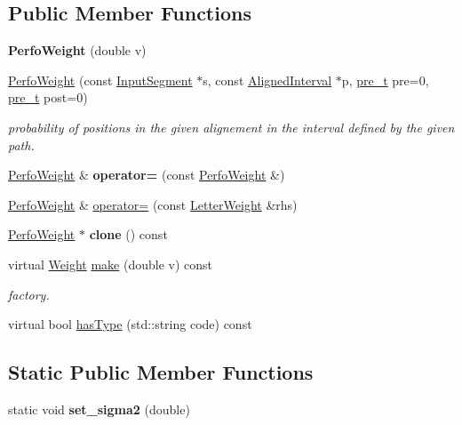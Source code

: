 \subsection*{Public Member Functions}
\begin{DoxyCompactItemize}
\item 
\mbox{\label{classPerfoWeight_a37edc602ff52c15e3a3306935c4f7f2a}} 
{\bfseries Perfo\+Weight} (double v)
\item 
\mbox{\hyperlink{group__weight_gaa4edfc478ea676a169bd5b58b82ff352}{Perfo\+Weight}} (const \mbox{\hyperlink{classInputSegment}{Input\+Segment}} $\ast$s, const \mbox{\hyperlink{classAlignedInterval}{Aligned\+Interval}} $\ast$p, \mbox{\hyperlink{group__general_ga092fe8b972dfa977c2a0886720a7731e}{pre\+\_\+t}} pre=0, \mbox{\hyperlink{group__general_ga092fe8b972dfa977c2a0886720a7731e}{pre\+\_\+t}} post=0)
\begin{DoxyCompactList}\small\item\em probability of positions in the given alignement in the interval defined by the given path. \end{DoxyCompactList}\item 
\mbox{\hyperlink{classPerfoWeight}{Perfo\+Weight}} \& {\bfseries operator=} (const \mbox{\hyperlink{classPerfoWeight}{Perfo\+Weight}} \&)
\item 
\mbox{\hyperlink{classPerfoWeight}{Perfo\+Weight}} \& \mbox{\hyperlink{group__weight_gaabb75d1419be3bb59dcdd3b8e56b0e63}{operator=}} (const \mbox{\hyperlink{classLetterWeight}{Letter\+Weight}} \&rhs)
\item 
\mbox{\label{classPerfoWeight_a8023bda84f8e883bbad23b31c1ccdd0b}} 
\mbox{\hyperlink{classPerfoWeight}{Perfo\+Weight}} $\ast$ {\bfseries clone} () const
\item 
virtual \mbox{\hyperlink{classWeight}{Weight}} \mbox{\hyperlink{classPerfoWeight_ad9237d9b3fccf6f0b70133e10c1103b2}{make}} (double v) const
\begin{DoxyCompactList}\small\item\em factory. \end{DoxyCompactList}\item 
virtual bool \mbox{\hyperlink{classPerfoWeight_a170351b18fd33ea7753d8b82eb83ae9e}{has\+Type}} (std\+::string code) const
\end{DoxyCompactItemize}
\subsection*{Static Public Member Functions}
\begin{DoxyCompactItemize}
\item 
static void {\bfseries set\+\_\+sigma2} (double)
\end{DoxyCompactItemize}
